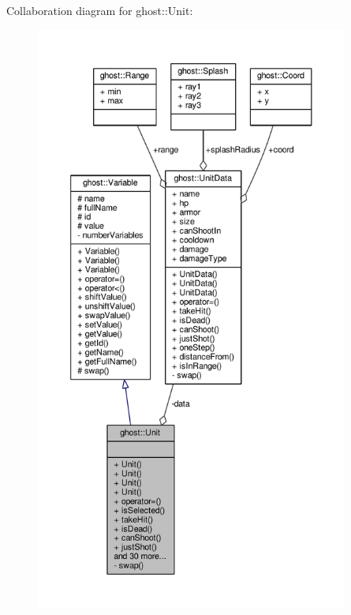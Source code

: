 Collaboration diagram for ghost\-:\-:Unit\-:
\nopagebreak
\begin{figure}[H]
\begin{center}
\leavevmode
\includegraphics[height=550pt]{classghost_1_1Unit__coll__graph}
\end{center}
\end{figure}
